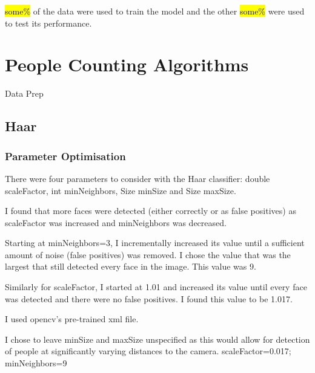 \documentclass{article}
\begin{document}
\hl{some\%} of the data were used to train the model and the other \hl{some\%} were used to test its performance.

\section{People Counting Algorithms}
Data Prep

\subsection{Haar}

\subsubsection{Parameter Optimisation}
There were four parameters to consider with the Haar classifier: double scaleFactor, int minNeighbors, Size minSize and Size maxSize.

I found that more faces were detected (either correctly or as false positives) as scaleFactor was increased and minNeighbors was decreased.

Starting at minNeighbors=3, I incrementally increased its value until a sufficient amount of noise (false positives) was removed. I chose the value that was the largest that still detected every face in the image. This value was 9.

Similarly for scaleFactor, I started at 1.01 and increased its value until every face was detected and there were no false positives. I found this value to be 1.017. 

I used opencv's pre-trained xml file.

I chose to leave minSize and maxSize unspecified as this would allow for detection of people at significantly varying distances to the camera.
scaleFactor=0.017; minNeighbors=9

\end{document}
